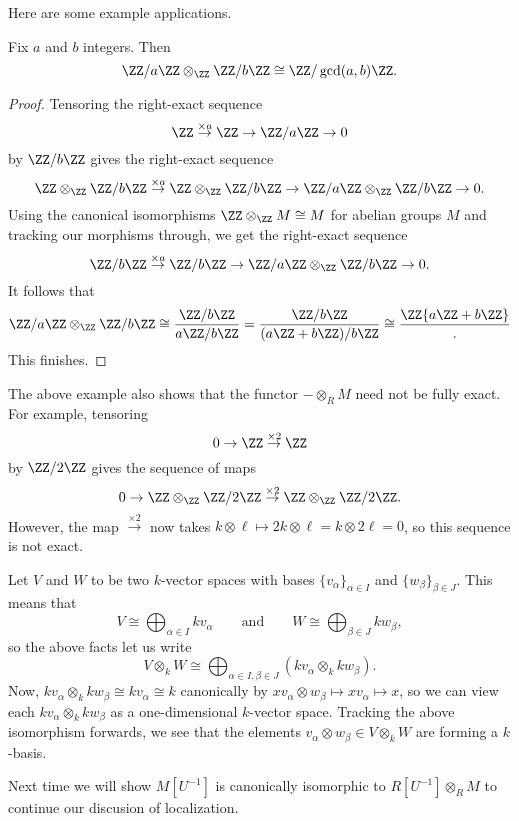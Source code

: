 Here are some example applications.
\begin{exe}
	Fix $a$ and $b$ integers. Then
	\[\ZZ/a\ZZ\otimes_\ZZ\ZZ/b\ZZ\cong\ZZ/\gcd(a,b)\ZZ.\]
\end{exe}
\begin{proof}
	Tensoring the right-exact sequence
	\[\ZZ\stackrel{\times a}\to\ZZ\to\ZZ/a\ZZ\to0\]
	by $\ZZ/b\ZZ$ gives the right-exact sequence
	\[\ZZ\otimes_\ZZ\ZZ/b\ZZ\stackrel{\times a}\to\ZZ\otimes_\ZZ\ZZ/b\ZZ\to\ZZ/a\ZZ\otimes_\ZZ\ZZ/b\ZZ\to0.\]
	Using the canonical isomorphisms $\ZZ\otimes_\ZZ M\cong M$ for abelian groups $M$ and tracking our morphisms through, we get the right-exact sequence
	\[\ZZ/b\ZZ\stackrel{\times a}\to\ZZ/b\ZZ\to\ZZ/a\ZZ\otimes_\ZZ\ZZ/b\ZZ\to0.\]
	It follows that
	\[\ZZ/a\ZZ\otimes_\ZZ\ZZ/b\ZZ\cong\frac{\ZZ/b\ZZ}{a\ZZ/b\ZZ}=\frac{\ZZ/b\ZZ}{(a\ZZ+b\ZZ)/b\ZZ}\cong\frac\ZZ{a\ZZ+b\ZZ}.\]
	This finishes.
\end{proof}
\begin{remark}
	The above example also shows that the functor $-\otimes_RM$ need not be fully exact. For example, tensoring
	\[0\to\ZZ\stackrel{\times2}\to\ZZ\]
	by $\ZZ/2\ZZ$ gives the sequence of maps
	\[0\to\ZZ\otimes_\ZZ\ZZ/2\ZZ\stackrel{\times2}\to\ZZ\otimes_\ZZ\ZZ/2\ZZ.\]
	However, the map $\stackrel{\times2}\to$ now takes $k\otimes\ell\mapsto2k\otimes\ell=k\otimes2\ell=0$, so this sequence is not exact.
\end{remark}
\begin{example}
	Let $V$ and $W$ to be two $k$-vector spaces with bases $\{v_\alpha\}_{\alpha\in I}$ and $\{w_\beta\}_{\beta\in J}$. This means that
	\[V\cong\bigoplus_{\alpha\in I}kv_\alpha\qquad\text{and}\qquad W\cong\bigoplus_{\beta\in J}kw_\beta,\]
	so the above facts let us write
	\[V\otimes_kW\cong\bigoplus_{\alpha\in I,\beta\in J}(kv_\alpha\otimes_kkw_\beta).\]
	Now, $kv_\alpha\otimes_kkw_\beta\cong kv_\alpha\cong k$ canonically by $xv_\alpha\otimes w_\beta\mapsto xv_\alpha\mapsto x$, so we can view each $kv_\alpha\otimes_kkw_\beta$ as a one-dimensional $k$-vector space. Tracking the above isomorphism forwards, we see that the elements $v_\alpha\otimes w_\beta\in V\otimes_kW$ are forming a $k$-basis.
\end{example}
Next time we will show $M\left[U^{-1}\right]$ is canonically isomorphic to $R\left[U^{-1}\right]\otimes_RM$ to continue our discusion of localization.